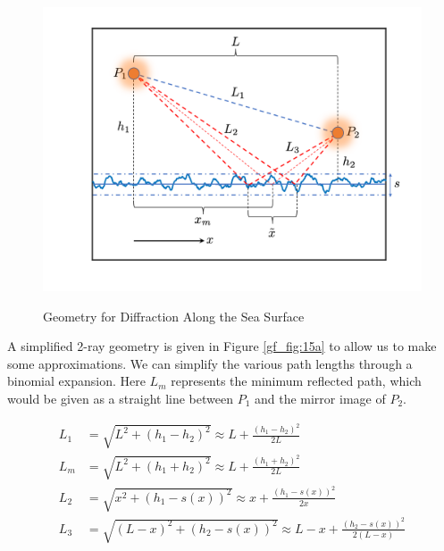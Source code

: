 \begin{figure}[ht]
  \begin{center}
\includegraphics[width=5in]{../media/analysis/multipath_layout.png}
  \end{center}
  \renewcommand{\baselinestretch}{1} \small\normalsize
  \begin{quote}
    \caption[Geometry for Diffraction Along the Sea Surface]{Geometry for Diffraction Along the Sea Surface\label{gf_fig:15}}
  \end{quote}
\end{figure}
\renewcommand{\baselinestretch}{2} \small\normalsize

A simplified 2-ray geometry is given in Figure \ref{gf_fig:15a} to allow us to make some approximations. We can simplify the various path lengths through a binomial expansion. Here $L_m$ represents the minimum reflected path, which would be given as a straight line between $P_1$ and the mirror image of $P_2$. 

\begin{equation}
\begin{aligned}
L_1 & = \sqrt{L^2 + (h_1-h_2)^2}  \approx L + \frac{(h_1 - h_2)^2}{2L}\\
L_m & = \sqrt{L^2 + (h_1+h_2)^2}  \approx L + \frac{(h_1 + h_2)^2}{2L}\\
L_2 &= \sqrt{x^2 + \left( h_1 - s(x)\right)^2}  \approx x + \frac{(h_1-s(x))^2}{2x}\\
L_3 & = \sqrt{\left(L - x\right)^2 + \left( h_2 - s(x)\right)^2}  \approx L-x + \frac{(h_2 - s(x))^2}{2\left(L-x\right)}\\
\end{aligned}
\label{gf_eq:59}
\end{equation}
\renewcommand{\baselinestretch}{2} \small\normalsize

